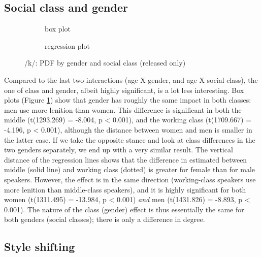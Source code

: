 \subsection{Social class and gender}
\label{sec.prod.res.con.k.classgender}

\begin{figure}[h]
	\centering
	\begin{subfigure}{.49\textwidth}
		\centering
			\resizebox{\linewidth}{!}{} 
		\caption{box plot}
		\label{fig.box.k.classgender}
	\end{subfigure}
	\begin{subfigure}{.49\textwidth}
		\centering
			\resizebox{\linewidth}{!}{} 
		\caption{regression plot}
		\label{fig.scatter.k.classgender}
	\end{subfigure}
	\caption{/k/: PDF by gender and social class (released only)}
\end{figure}

Compared to the last two interactions (age X gender, and age X social class), the one of class and gender, albeit highly significant, is a lot less interesting.
Box plots (Figure \ref{fig.box.k.classgender}) show that gender has roughly the same impact in both classes: men use more lenition than women.
This difference is significant in both the middle (t(1293.269) = -8.004, p < 0.001), and the working class (t(1709.667) = -4.196, p < 0.001), although the distance between women and men is smaller in the latter case.
If we take the opposite stance and look at class differences in the two genders separately, we end up with a very similar result.
The vertical distance of the regression lines shows that the difference in estimated  between middle (solid line) and working class (dotted) is greater for female than for male speakers.
However, the effect is in the same direction (working-class speakers use more lenition than middle-class speakers), and it is highly significant for both women (t(1311.495) = -13.984, p < 0.001) \emph{and} men (t(1431.826) = -8.893, p < 0.001).
The nature of the class (gender) effect is thus essentially the same for both genders (social classes); there is only a difference in degree.

\subsection{Style shifting}
\label{sec.prod.res.con.k.shifting}

